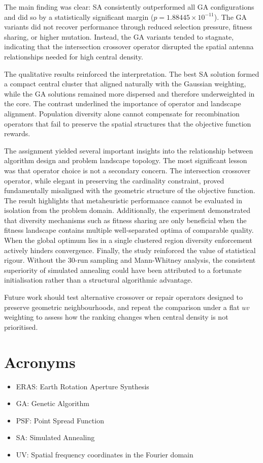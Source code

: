 \documentclass[conference]{IEEEtran}
\begin{document}
The main finding was clear: SA consistently outperformed all GA configurations and did so 
by a statistically significant margin ($p = 1.88445 \times 10^{-11}$). The GA variants did not 
recover performance through reduced selection pressure, fitness sharing, or higher mutation. 
Instead, the GA variants tended to stagnate, indicating that the intersection crossover operator disrupted 
the spatial antenna relationships needed for high central density.

The qualitative results reinforced the interpretation. The best SA solution formed a compact 
central cluster that aligned naturally with the Gaussian weighting, while the GA solutions 
remained more dispersed and therefore underweighted in the core. The contrast underlined 
the importance of operator and landscape alignment. Population diversity alone cannot compensate 
for recombination operators that fail to preserve the spatial structures that the objective 
function rewards.

The assignment yielded several important insights into the relationship between algorithm 
design and problem landscape topology. The most significant lesson was that operator 
choice is not a secondary concern. The intersection crossover operator, while elegant in 
preserving the cardinality constraint, proved fundamentally misaligned with the geometric 
structure of the objective function. The result highlights that metaheuristic performance cannot 
be evaluated in isolation from the problem domain. Additionally, the experiment demonstrated 
that diversity mechanisms such as fitness sharing are only beneficial when the fitness 
landscape contains multiple well-separated optima of comparable quality. When the global 
optimum lies in a single clustered region diversity enforcement actively 
hinders convergence. Finally, the study reinforced the value of statistical rigour. Without 
the 30-run sampling and Mann-Whitney analysis, the consistent superiority of simulated 
annealing could have been attributed to a fortunate initialisation rather than a structural 
algorithmic advantage.

Future work should test alternative crossover or repair operators designed to preserve 
geometric neighbourhoods, and repeat the comparison under a flat $uv$ weighting to assess 
how the ranking changes when central density is not prioritised.

\section{Acronyms}
\begin{itemize}
    \item ERAS: Earth Rotation Aperture Synthesis
    \item GA: Genetic Algorithm
    \item PSF: Point Spread Function
    \item SA: Simulated Annealing
    \item UV: Spatial frequency coordinates in the Fourier domain
\end{itemize}
\end{document}
